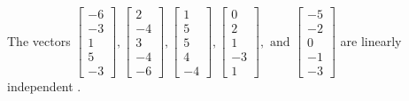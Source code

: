 \begin{exercise}
\begin{exerciseStatement}
  \end{exerciseStatement}
  \begin{exerciseAnswer}
   The vectors \(\left[\begin{array}{r}
-6 \\
-3 \\
1 \\
5 \\
-3
\end{array}\right] , \left[\begin{array}{r}
2 \\
-4 \\
3 \\
-4 \\
-6
\end{array}\right] , \left[\begin{array}{r}
1 \\
5 \\
5 \\
4 \\
-4
\end{array}\right] , \left[\begin{array}{r}
0 \\
2 \\
1 \\
-3 \\
1
\end{array}\right] , \text{ and } \left[\begin{array}{r}
-5 \\
-2 \\
0 \\
-1 \\
-3
\end{array}\right]\) are 
  	 linearly independent  .
  


  \end{exerciseAnswer}
\end{exercise}